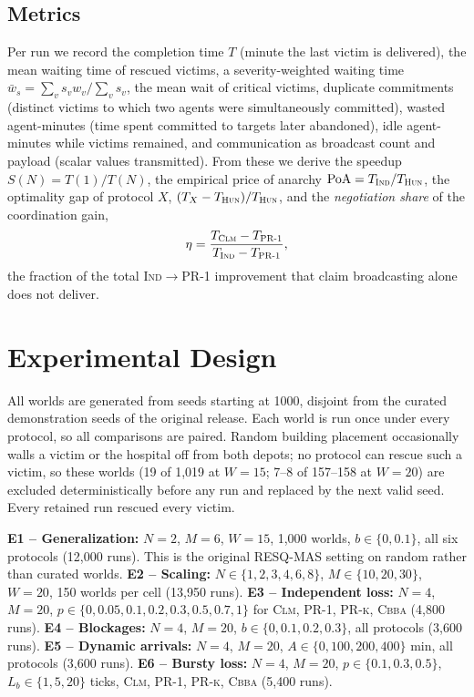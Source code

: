 \documentclass[conference]{IEEEtran}
\newcommand{\IND}{\textsc{Ind}}
\newcommand{\CLM}{\textsc{Clm}}
\newcommand{\PRone}{\textsc{PR-1}}
\newcommand{\PRk}{\textsc{PR-k}}
\newcommand{\HUN}{\textsc{Hun}}
\newcommand{\CBBA}{\textsc{Cbba}}
\begin{document}
\subsection{Metrics}
Per run we record the completion time $T$ (minute the last victim is delivered), the mean waiting time of rescued victims, a severity-weighted waiting time $\bar w_s=\sum_v s_v w_v / \sum_v s_v$, the mean wait of critical victims, duplicate commitments (distinct victims to which two agents were simultaneously committed), wasted agent-minutes (time spent committed to targets later abandoned), idle agent-minutes while victims remained, and communication as broadcast count and payload (scalar values transmitted). From these we derive the speedup $S(N)=T(1)/T(N)$, the empirical price of anarchy $\mathrm{PoA}=T_{\IND}/T_{\HUN}$, the optimality gap of protocol $X$, $(T_X-T_{\HUN})/T_{\HUN}$, and the \emph{negotiation share} of the coordination gain,
\begin{equation}
\eta = \frac{T_{\CLM} - T_{\PRone}}{T_{\IND} - T_{\PRone}},
\label{eq:eta}
\end{equation}
the fraction of the total \IND{}$\rightarrow$\PRone{} improvement that claim broadcasting alone does not deliver.

\section{Experimental Design}
All worlds are generated from seeds starting at 1000, disjoint from the curated demonstration seeds of the original release. Each world is run once under every protocol, so all comparisons are paired. Random building placement occasionally walls a victim or the hospital off from both depots; no protocol can rescue such a victim, so these worlds (19 of 1,019 at $W=15$; 7--8 of 157--158 at $W=20$) are excluded deterministically before any run and replaced by the next valid seed. Every retained run rescued every victim.

\textbf{E1 -- Generalization:} $N=2$, $M=6$, $W=15$, 1,000 worlds, $b\in\{0,0.1\}$, all six protocols (12,000 runs). This is the original RESQ-MAS setting on random rather than curated worlds.
\textbf{E2 -- Scaling:} $N\in\{1,2,3,4,6,8\}$, $M\in\{10,20,30\}$, $W=20$, 150 worlds per cell (13,950 runs).
\textbf{E3 -- Independent loss:} $N=4$, $M=20$, $p\in\{0,0.05,0.1,0.2,0.3,0.5,0.7,1\}$ for \CLM{}, \PRone{}, \PRk{}, \CBBA{} (4,800 runs).
\textbf{E4 -- Blockages:} $N=4$, $M=20$, $b\in\{0,0.1,0.2,0.3\}$, all protocols (3,600 runs).
\textbf{E5 -- Dynamic arrivals:} $N=4$, $M=20$, $A\in\{0,100,200,400\}$ min, all protocols (3,600 runs).
\textbf{E6 -- Bursty loss:} $N=4$, $M=20$, $p\in\{0.1,0.3,0.5\}$, $L_b\in\{1,5,20\}$ ticks, \CLM{}, \PRone{}, \PRk{}, \CBBA{} (5,400 runs).
\end{document}
